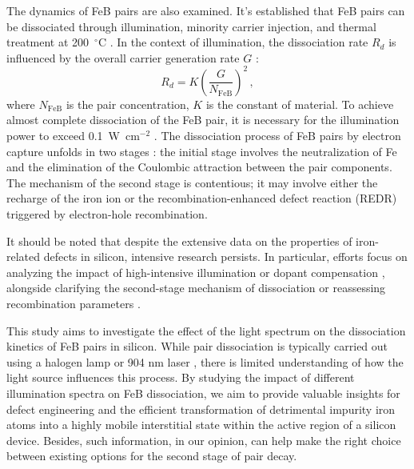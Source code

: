 \documentclass{WileyMSP-template}
\begin{document}
The dynamics of FeB pairs are also examined.
It's established that FeB pairs can be dissociated through illumination, minority carrier injection, and thermal treatment at 200~$^\circ$C \cite{FeBAssJAP2014}.
In the context of illumination, the dissociation rate $R_d$ is influenced by the overall carrier generation rate $G$ \cite{FeBLight2,FeBAssJAP2014,FeBKin2019,FeMethod2012}:
\begin{equation}
\label{eqRd}
R_d=K\left(\frac{G}{N_\mathrm{FeB}}\right)^2\,,
\end{equation}
where
$N_\mathrm{FeB}$ is the pair concentration,
$K$ is the constant of material.
To achieve almost complete dissociation of the FeB pair, it is necessary for the illumination power to exceed 0.1~W~cm$^{-2}$ \cite{Macdonald2004}.
The dissociation process of FeB pairs by electron capture unfolds in two stages \cite{KIMERLINGFeB,FeBAssJAP2014}:
the initial stage involves the neutralization of Fe and the elimination of the Coulombic attraction between the pair components.
The mechanism of the second stage is contentious; it may involve either the recharge of the iron ion or the recombination-enhanced defect reaction
(REDR) triggered by electron-hole recombination.


It should be noted that despite the extensive data on the properties of iron-related defects in silicon, intensive research persists.
In particular, efforts focus on analyzing the impact of high-intensive  illumination \cite{FeBStrongIll}
or dopant compensation \cite{Zhu2015},
alongside clarifying the second-stage mechanism of dissociation \cite{Sun2021}
or reassessing recombination parameters \cite{Le2024}.

This study aims to investigate the effect of the light spectrum on the dissociation kinetics of FeB pairs in silicon.
While pair dissociation is typically carried out using a halogen lamp \cite{FeBLight2,Sun2021}
or 904 nm laser \cite{FeBStrongIll,FeBAssJAP2014,lauer2016}, there is limited understanding of how the light source influences this process.
By studying the impact of different illumination spectra on FeB dissociation,
we aim to provide valuable insights for defect engineering and the efficient transformation of detrimental impurity iron atoms into a highly mobile interstitial state
within the active region of a silicon device.
Besides, such information, in our opinion, can help make the right choice between existing options for the second stage of pair decay.
\end{document}
